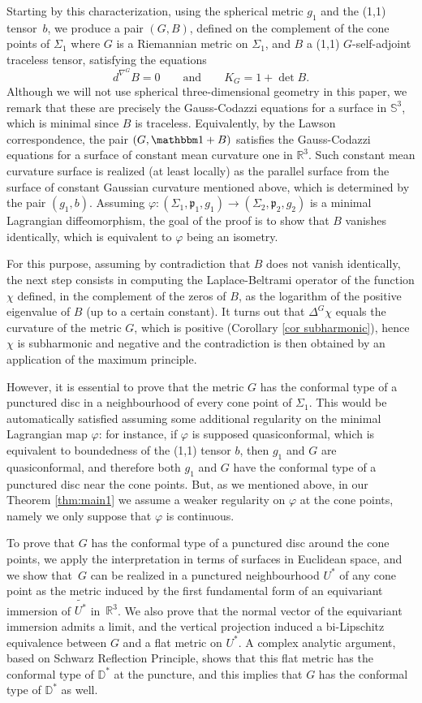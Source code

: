 \documentclass[JEP,XML,SOM,Unicode,NoEqCountersInSection,published]{cedram}
\theoremstyle{definition}
\newcommand{\R}{{\mathbb R}}
\begin{document}
Starting by this characterization, using the spherical metric $g_1$ and the (1,1) tensor~$b$, we produce a pair $(G,B)$, {defined on the complement of the cone points of $\Sigma_1$} where $G$ is a Riemannian metric on $\Sigma_1$, and $B$ a (1,1) $G$-self-adjoint traceless tensor, satisfying the equations
\[
d^{\nabla^G}\!\!B=0\qquad\text{and}\qquad K_G=1+\det B.
\]
Although we will not use spherical three-dimensional geometry in this paper, we remark that these are precisely the Gauss-Codazzi equations for a surface in $\mathbb S^3$, which is minimal since $B$ is traceless. Equivalently, by the Lawson correspondence, the pair $(G,\mathbbm 1+B)$ satisfies the Gauss-Codazzi equations for a surface of constant mean curvature one in $\R^3$. Such constant mean curvature surface is realized (at least locally) as the parallel surface from the surface of constant Gaussian curvature mentioned above, which is determined by the pair $(g_1,b)$.
Assuming $\varphi:(\Sigma_1,\mathfrak p_1,g_1)\to(\Sigma_2,\mathfrak p_2,g_2)$ is a minimal Lagrangian diffeomorphism, the goal of the proof is to show that $B$ vanishes identically, which is equivalent to $\varphi$ being an isometry.

For this purpose, assuming by contradiction that $B$ does not vanish identically, the next step consists in computing the Laplace-Beltrami operator of the function $\chi$ defined, in the complement of the zeros of $B$, as the logarithm of the positive eigenvalue of $B$ (up to a certain constant). It turns out that $\Delta^G\chi$ equals the curvature of the metric $G$, which is positive (Corollary \ref{cor subharmonic}), hence $\chi$ is subharmonic and negative and the contradiction is then obtained by an application of the maximum principle.

However, it is essential to prove that the metric $G$ has the conformal type of a punctured disc in a neighbourhood of every cone point of $\Sigma_1$. This would be automatically satisfied assuming some additional regularity on the minimal Lagrangian map $\varphi$: for instance, if $\varphi$ is supposed quasiconformal, which is equivalent to boundedness of the (1,1) tensor $b$, then $g_1$ and $G$ are quasiconformal, and therefore both $g_1$ and $G$ have the conformal type of a punctured disc near the cone points.
But, as we mentioned above, in our Theorem \ref{thm:main1} we assume a weaker regularity on $\varphi$ at the cone points, namely we only suppose that $\varphi$ is continuous.

To prove that $G$ has the conformal type of a punctured disc around the cone points, we apply the interpretation in terms of surfaces in Euclidean space, and we show that~$G$ can be realized in a punctured neighbourhood $U^*$ of any cone point as the metric induced by the first fundamental form of an equivariant immersion of $\widetilde{U^*}$ in~$\R^3$. We also prove that the normal vector of the equivariant immersion admits a limit, and the vertical projection induced a bi-Lipschitz equivalence between $G$ and a flat metric on $U^*$. A complex analytic argument, based on Schwarz Reflection Principle, shows that this flat metric has the conformal type of $\mathbb D^*$ at the puncture, and this implies that $G$ has the conformal type of $\mathbb D^*$ as well.
\end{document}
